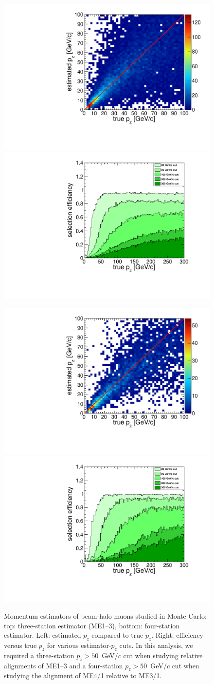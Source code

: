 \documentclass[12pt]{article}
\begin{document}
\begin{figure}
\begin{center}
\includegraphics[width=0.4\linewidth]{estimator123_resolution.pdf}
\includegraphics[width=0.4\linewidth]{estimator123_turnon.pdf}

\includegraphics[width=0.4\linewidth]{estimator1234_resolution.pdf}
\includegraphics[width=0.4\linewidth]{estimator1234_turnon.pdf}
\end{center}

\caption{Momentum estimators of beam-halo muons studied in Monte
  Carlo; top: three-station estimator (ME1--3), bottom: four-station
  estimator.  Left: estimated $p_z$ compared to true $p_z$.  Right:
  efficiency versus true $p_z$ for various estimator-$p_z$ cuts.  In
  this analysis, we required a three-station $p_z > 50$~GeV/$c$ cut
  when studying relative alignments of ME1--3 and a four-station $p_z
  > 50$~GeV/$c$ cut when studying the alignment of ME4/1 relative to
  ME3/1. \label{fig:momentum}}
\end{figure}
\end{document}
